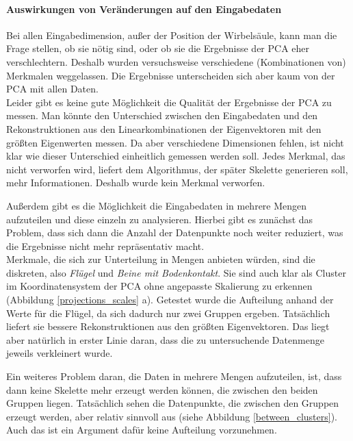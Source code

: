  \paragraph{Auswirkungen von Veränderungen auf den Eingabedaten}
 Bei allen Eingabedimension, außer der Position der Wirbelsäule, kann man die Frage stellen, ob sie nötig sind, oder ob sie die Ergebnisse der PCA eher verschlechtern. Deshalb wurden versuchsweise verschiedene (Kombinationen von) Merkmalen weggelassen. Die Ergebnisse unterscheiden sich aber kaum von der PCA mit allen Daten. \\
 Leider gibt es keine gute Möglichkeit die Qualität der Ergebnisse der PCA zu messen. Man könnte den Unterschied zwischen den Eingabedaten und den Rekonstruktionen aus den Linearkombinationen der Eigenvektoren mit den größten Eigenwerten messen. Da aber verschiedene Dimensionen fehlen, ist nicht klar wie dieser Unterschied einheitlich gemessen werden soll.
 Jedes Merkmal, das nicht verworfen wird, liefert dem Algorithmus, der später Skelette generieren soll, mehr Informationen. Deshalb wurde kein Merkmal verworfen.
 
 Außerdem gibt es die Möglichkeit die Eingabedaten in mehrere Mengen aufzuteilen und diese einzeln zu analysieren. Hierbei gibt es zunächst das Problem, dass sich dann die Anzahl der Datenpunkte noch weiter reduziert, was die Ergebnisse nicht mehr repräsentativ macht.\\
 Merkmale, die sich zur Unterteilung in Mengen anbieten würden, sind die diskreten, also \emph{Flügel} und \emph{Beine mit Bodenkontakt}. Sie sind auch klar als Cluster im Koordinatensystem der PCA ohne angepasste Skalierung zu erkennen (Abbildung \ref{projections_scales} a).
 Getestet wurde die Aufteilung anhand der Werte für die Flügel, da sich dadurch nur zwei Gruppen ergeben. Tatsächlich liefert sie bessere Rekonstruktionen aus den größten Eigenvektoren. Das liegt aber natürlich in erster Linie daran, dass die zu untersuchende Datenmenge jeweils verkleinert wurde.
 
 Ein weiteres Problem daran, die Daten in mehrere Mengen aufzuteilen, ist, dass dann keine Skelette mehr erzeugt werden können, die zwischen den beiden Gruppen liegen. Tatsächlich sehen die Datenpunkte, die zwischen den Gruppen erzeugt werden, aber relativ sinnvoll aus (siehe Abbildung \ref{between_clusters}).
 Auch das ist ein Argument dafür keine Aufteilung vorzunehmen.
 
